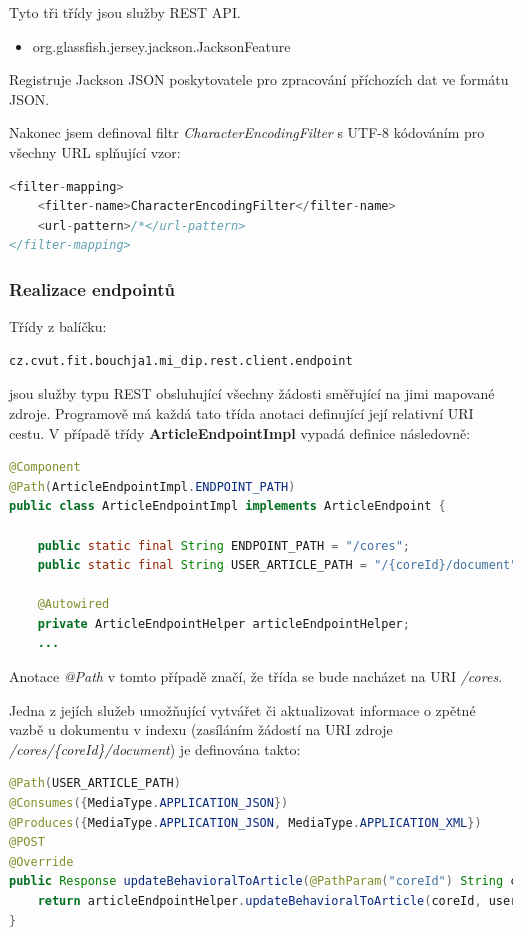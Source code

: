 \documentclass[thesis=M,czech]{FITthesis}[2014/05/07]
\begin{document}
	Tyto tři třídy jsou služby REST API. 
	
\begin{itemize}	
	\item org.glassfish.jersey.jackson.JacksonFeature		
\end{itemize}	
	Registruje Jackson JSON poskytovatele pro zpracování příchozích dat ve formátu JSON.

Nakonec jsem definoval filtr \emph{CharacterEncodingFilter} s UTF-8 kódováním pro všechny URL splňující vzor:

\begin{lstlisting}[language=java]
<filter-mapping>
    <filter-name>CharacterEncodingFilter</filter-name>
    <url-pattern>/*</url-pattern>
</filter-mapping>    
\end{lstlisting}

\subsubsection{Realizace endpointů}
\label{sec:endpoints}
Třídy z balíčku:

\begin{verbatim}
cz.cvut.fit.bouchja1.mi_dip.rest.client.endpoint
\end{verbatim}

jsou služby typu REST obsluhující všechny žádosti směřující na jimi mapované zdroje. Programově má každá tato třída anotaci definující její relativní URI cestu. V případě třídy \textbf{ArticleEndpointImpl} vypadá definice následovně:

\begin{lstlisting}[language=java]
@Component
@Path(ArticleEndpointImpl.ENDPOINT_PATH)
public class ArticleEndpointImpl implements ArticleEndpoint {
    
    public static final String ENDPOINT_PATH = "/cores";
    public static final String USER_ARTICLE_PATH = "/{coreId}/document";

    @Autowired
    private ArticleEndpointHelper articleEndpointHelper;  	
    ...
\end{lstlisting}

Anotace \emph{@Path} v tomto případě značí, že třída se bude nacházet na URI \emph{/cores}.

Jedna z jejích služeb umožňující vytvářet či aktualizovat informace o zpětné vazbě u dokumentu v indexu (zasíláním žádostí na URI zdroje \emph{/cores/\{coreId\}/document}) je definována takto:

\begin{lstlisting}[language=java]
@Path(USER_ARTICLE_PATH)
@Consumes({MediaType.APPLICATION_JSON})
@Produces({MediaType.APPLICATION_JSON, MediaType.APPLICATION_XML})
@POST
@Override
public Response updateBehavioralToArticle(@PathParam("coreId") String coreId, UserArticleDocument userArticle) {
    return articleEndpointHelper.updateBehavioralToArticle(coreId, userArticle);
} 
\end{lstlisting}
\end{document}
